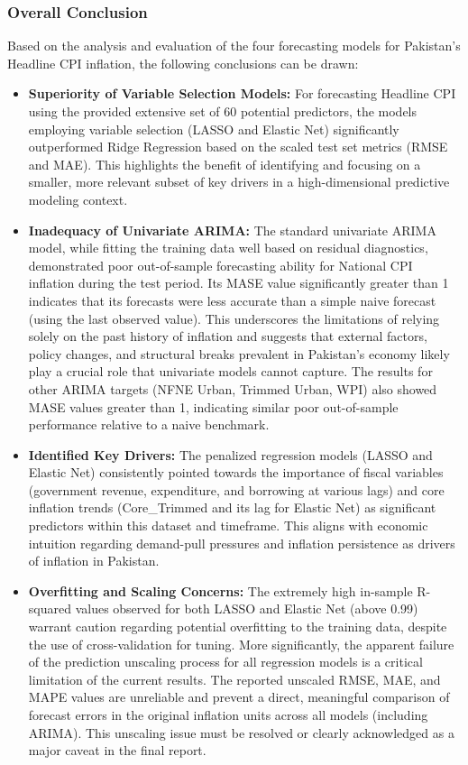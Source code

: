 \documentclass[12pt,a4paper]{article}
\begin{document}
\subsubsection{Overall Conclusion}

Based on the analysis and evaluation of the four forecasting models for Pakistan's Headline CPI inflation, the following conclusions can be drawn:

\begin{itemize}
    \item \textbf{Superiority of Variable Selection Models:} For forecasting Headline CPI using the provided extensive set of 60 potential predictors, the models employing variable selection (LASSO and Elastic Net) significantly outperformed Ridge Regression based on the scaled test set metrics (RMSE and MAE). This highlights the benefit of identifying and focusing on a smaller, more relevant subset of key drivers in a high-dimensional predictive modeling context.
    \item \textbf{Inadequacy of Univariate ARIMA:} The standard univariate ARIMA model, while fitting the training data well based on residual diagnostics, demonstrated poor out-of-sample forecasting ability for National CPI inflation during the test period. Its MASE value significantly greater than 1 indicates that its forecasts were less accurate than a simple naive forecast (using the last observed value). This underscores the limitations of relying solely on the past history of inflation and suggests that external factors, policy changes, and structural breaks prevalent in Pakistan's economy likely play a crucial role that univariate models cannot capture. The results for other ARIMA targets (NFNE Urban, Trimmed Urban, WPI) also showed MASE values greater than 1, indicating similar poor out-of-sample performance relative to a naive benchmark.
    \item \textbf{Identified Key Drivers:} The penalized regression models (LASSO and Elastic Net) consistently pointed towards the importance of fiscal variables (government revenue, expenditure, and borrowing at various lags) and core inflation trends (Core\_Trimmed and its lag for Elastic Net) as significant predictors within this dataset and timeframe. This aligns with economic intuition regarding demand-pull pressures and inflation persistence as drivers of inflation in Pakistan.
    \item \textbf{Overfitting and Scaling Concerns:} The extremely high in-sample R-squared values observed for both LASSO and Elastic Net (above 0.99) warrant caution regarding potential overfitting to the training data, despite the use of cross-validation for tuning. More significantly, the apparent failure of the prediction unscaling process for all regression models is a critical limitation of the current results. The reported unscaled RMSE, MAE, and MAPE values are unreliable and prevent a direct, meaningful comparison of forecast errors in the original inflation units across all models (including ARIMA). This unscaling issue must be resolved or clearly acknowledged as a major caveat in the final report.

\end{itemize}
\end{document}

